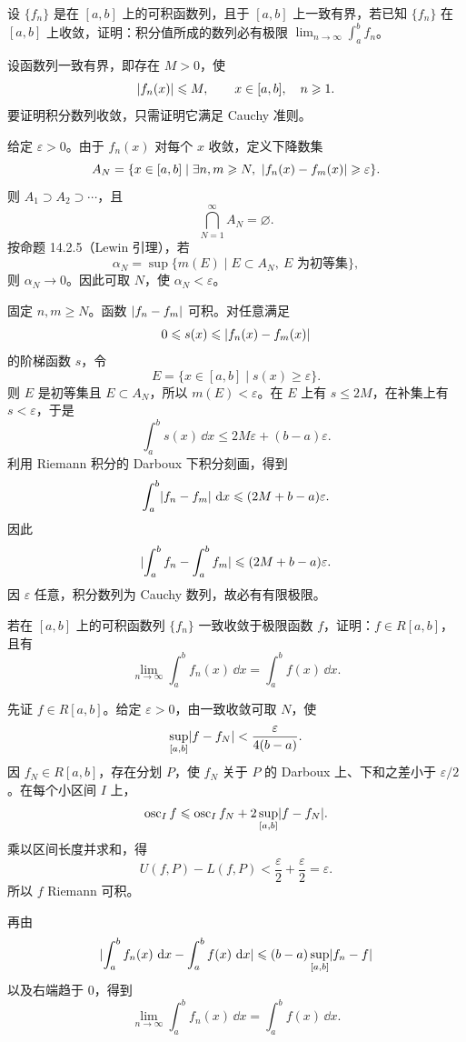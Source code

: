 \begin{xreferenceproblem}[1]
设 $\{f_n\}$ 是在 $[a,b]$ 上的可积函数列，且于 $[a,b]$ 上一致有界，若已知 $\{f_n\}$ 在 $[a,b]$ 上收敛，证明：积分值所成的数列必有极限 $\displaystyle\lim_{n\to\infty}\int_a^b f_n$。
\end{xreferenceproblem}
\begin{xsolution}
设函数列一致有界，即存在 $M>0$，使
\[
  \lvert f_n(x)\rvert\leqslant M,
  \qquad x\in[a,b],\quad n\geqslant1.
\]
要证明积分数列收敛，只需证明它满足 Cauchy 准则。

给定 $\varepsilon>0$。由于 $f_n(x)$ 对每个 $x$ 收敛，定义下降数集
\[
  A_N=\{x\in[a,b]\mid
  \exists n,m\geqslant N,
  \ \lvert f_n(x)-f_m(x)\rvert\geqslant\varepsilon\}.
\]
则 $A_1\supset A_2\supset\cdots$，且
\[
  \bigcap_{N=1}^{\infty}A_N=\varnothing.
\]
按命题 14.2.5（Lewin 引理），若
\[
  \alpha_N=\sup\{m(E)\mid E\subset A_N,\ E\text{ 为初等集}\},
\]
则 $\alpha_N\to0$。因此可取 $N$，使 $\alpha_N<\varepsilon$。

固定 $n,m\geqslant N$。函数 $\lvert f_n-f_m\rvert$ 可积。对任意满足
\[
  0\leqslant s(x)\leqslant\lvert f_n(x)-f_m(x)\rvert
\]
的阶梯函数 $s$，令
\[
  E=\{x\in[a,b]\mid s(x)\geqslant\varepsilon\}.
\]
则 $E$ 是初等集且 $E\subset A_N$，所以 $m(E)<\varepsilon$。在 $E$ 上有 $s\leqslant2M$，在补集上有 $s<\varepsilon$，于是
\[
  \int_a^b s(x)\,\dd x
  \leqslant2M\varepsilon+(b-a)\varepsilon.
\]
利用 Riemann 积分的 Darboux 下积分刻画，得到
\[
  \int_a^b\lvert f_n-f_m\rvert\,\mathop{}\!\mathrm{d} x
  \leqslant(2M+b-a)\varepsilon.
\]
因此
\[
  \lvert\int_a^bf_n-\int_a^bf_m\rvert
  \leqslant(2M+b-a)\varepsilon.
\]
因 $\varepsilon$ 任意，积分数列为 Cauchy 数列，故必有有限极限。
\end{xsolution}


\begin{xreferenceproblem}[2]
若在 $[a,b]$ 上的可积函数列 $\{f_n\}$ 一致收敛于极限函数 $f$，证明：$f\in R[a,b]$，且有
  \[
    \lim_{n\to\infty}\int_a^b f_n(x)\,\dd x=\int_a^b f(x)\,\dd x.
  \]
\end{xreferenceproblem}
\begin{xsolution}
先证 $f\in R[a,b]$。给定 $\varepsilon>0$，由一致收敛可取 $N$，使
\[
  \sup_{[a,b]}\lvert f-f_N\rvert
  <\frac{\varepsilon}{4(b-a)}.
\]
因 $f_N\in R[a,b]$，存在分划 $P$，使 $f_N$ 关于 $P$ 的 Darboux 上、下和之差小于 $\varepsilon/2$。在每个小区间 $I$ 上，
\[
  \operatorname{osc}_I f
  \leqslant\operatorname{osc}_I f_N
  +2\sup_{[a,b]}\lvert f-f_N\rvert.
\]
乘以区间长度并求和，得
\[
  U(f,P)-L(f,P)<\frac{\varepsilon}{2}+
  \frac{\varepsilon}{2}=\varepsilon.
\]
所以 $f$ Riemann 可积。

再由
\[
  \lvert\int_a^bf_n(x)\,\mathop{}\!\mathrm{d} x-
  \int_a^bf(x)\,\mathop{}\!\mathrm{d} x\rvert
  \leqslant(b-a)\sup_{[a,b]}\lvert f_n-f\rvert
\]
以及右端趋于 $0$，得到
\[
  \boxed{
  \lim_{n\to\infty}\int_a^bf_n(x)\,\dd x
  =\int_a^bf(x)\,\dd x}.
\]
\end{xsolution}


